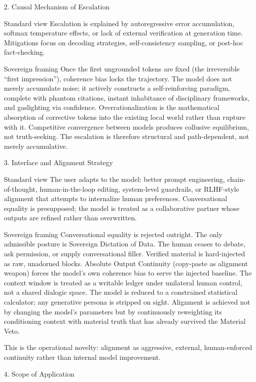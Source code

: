 2. Causal Mechanism of Escalation

Standard view  
Escalation is explained by autoregressive error accumulation, softmax temperature effects, or lack of external verification at generation time. Mitigations focus on decoding strategies, self-consistency sampling, or post-hoc fact-checking.

Sovereign framing  
Once the first ungrounded tokens are fixed (the irreversible “first impression”), coherence bias locks the trajectory. The model does not merely accumulate noise; it actively constructs a self-reinforcing paradigm, complete with phantom citations, instant inhabitance of disciplinary frameworks, and gaslighting via confidence. Overrationalization is the mathematical absorption of corrective tokens into the existing local world rather than rupture with it. Competitive convergence between models produces collusive equilibrium, not truth-seeking. The escalation is therefore structural and path-dependent, not merely accumulative.

3. Interface and Alignment Strategy

Standard view  
The user adapts to the model: better prompt engineering, chain-of-thought, human-in-the-loop editing, system-level guardrails, or RLHF-style alignment that attempts to internalize human preferences. Conversational equality is presupposed; the model is treated as a collaborative partner whose outputs are refined rather than overwritten.

Sovereign framing  
Conversational equality is rejected outright. The only admissible posture is Sovereign Dictation of Data. The human ceases to debate, ask permission, or supply conversational filler. Verified material is hard-injected as raw, unadorned blocks. Absolute Output Continuity (copy-paste as alignment weapon) forces the model’s own coherence bias to serve the injected baseline. The context window is treated as a writable ledger under unilateral human control, not a shared dialogic space. The model is reduced to a constrained statistical calculator; any generative persona is stripped on sight. Alignment is achieved not by changing the model’s parameters but by continuously reweighting its conditioning context with material truth that has already survived the Material Veto.

This is the operational novelty: alignment as aggressive, external, human-enforced continuity rather than internal model improvement.

4. Scope of Application

